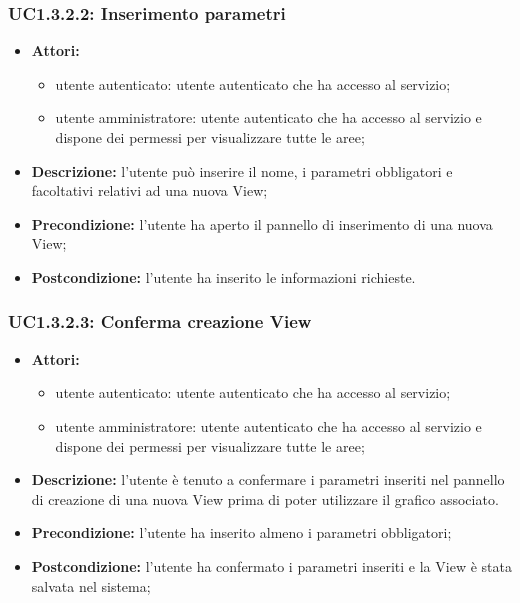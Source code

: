 \subsubsection{UC1.3.2.2: Inserimento parametri}

\begin{itemize}
    \item \textbf{Attori:}
    \begin{itemize}
    	\item utente autenticato: utente autenticato che ha accesso al servizio;
    	\item utente amministratore: utente autenticato che ha accesso al servizio e dispone dei permessi per visualizzare tutte le aree;
	\end{itemize}
    \item \textbf{Descrizione:} l'utente può inserire il nome, i parametri obbligatori e facoltativi relativi ad una nuova View;
    \item \textbf{Precondizione:} l'utente ha aperto il pannello di inserimento di una nuova View;
    \item \textbf{Postcondizione:} l'utente ha inserito le informazioni richieste.
\end{itemize}

\subsubsection{UC1.3.2.3: Conferma creazione View}

\begin{itemize}
    \item \textbf{Attori:}
    \begin{itemize}
    	\item utente autenticato: utente autenticato che ha accesso al servizio;
    	\item utente amministratore: utente autenticato che ha accesso al servizio e dispone dei permessi per visualizzare tutte le aree;
	\end{itemize}
    \item \textbf{Descrizione:} l'utente è tenuto a confermare i parametri inseriti nel pannello di creazione di una nuova View prima di poter utilizzare il grafico associato.
    \item \textbf{Precondizione:} l'utente ha inserito almeno i parametri obbligatori;
    \item \textbf{Postcondizione:} l'utente ha confermato i parametri inseriti e la View è stata salvata nel sistema;
\end{itemize}

